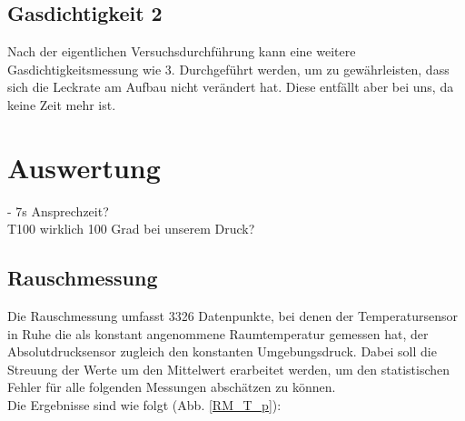 \documentclass[]{article}
\begin{document}
\subsection{Gasdichtigkeit 2}

Nach der eigentlichen Versuchsdurchführung kann eine weitere Gasdichtigkeitsmessung wie 3. Durchgeführt werden, um zu gewährleisten, dass sich die Leckrate am Aufbau nicht verändert hat. Diese entfällt aber bei uns, da keine Zeit mehr ist.

\section{Auswertung}
{\color{red}- 7s Ansprechzeit?}\\
{\color{red}T100 wirklich 100 Grad bei unserem Druck?}\\
\subsection{Rauschmessung}
Die Rauschmessung umfasst 3326 Datenpunkte, bei denen der Temperatursensor in Ruhe die als konstant angenommene Raumtemperatur gemessen hat, der Absolutdrucksensor zugleich den konstanten Umgebungsdruck. Dabei soll die Streuung der Werte um den Mittelwert erarbeitet werden, um den statistischen Fehler für alle folgenden Messungen abschätzen zu können.\\
Die Ergebnisse sind wie folgt (Abb. \ref{RM_T_p}):\\
\end{document}
